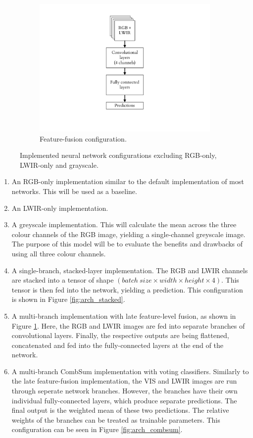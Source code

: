 \documentclass{l4proj}
\begin{document}
\begin{figure}[ht]
\begin{subfigure}[h!]{0.3\textwidth}
    \includegraphics[width=\textwidth, page={3}, trim={6.5cm 2.2cm 6.5cm 1.5cm}, clip]{images/models/archs}
    \caption{Feature-fusion configuration.}
    \label{fig:arch_fusion}
  \end{subfigure}
  \caption{Implemented neural network configurations excluding RGB-only, LWIR-only and grayscale.}
  \label{fig:archs}
\end{figure}

\begin{enumerate}
  \item An RGB-only implementation similar to the default implementation of most networks. This will be used as a baseline.
  \item An LWIR-only implementation.
  \item A greyscale implementation. This will calculate the mean across the three colour channels of the RGB image, yielding a single-channel greyscale image. The purpose of this model will be to evaluate the benefits and drawbacks of using all three colour channels.
  \item A single-branch, stacked-layer implementation. The RGB and LWIR channels are stacked into a tensor of shape $({batch\ size} \times width \times height \times 4)$. This tensor is then fed into the network, yielding a prediction. This configuration is shown in Figure \ref{fig:arch_stacked}.
  \item A multi-branch implementation with late feature-level fusion, as shown in Figure \ref{fig:arch_fusion}. Here, the RGB and LWIR images are fed into separate branches of convolutional layers. Finally, the respective outputs are being flattened, concatenated and fed into the fully-connected layers at the end of the network.
  \item A multi-branch CombSum implementation with voting classifiers. Similarly to the late feature-fusion implementation, the VIS and LWIR images are run through seperate network branches. However, the branches have their own individual fully-connected layers, which produce separate predictions. The final output is the weighted mean of these two predictions. The relative weights of the branches can be treated as trainable parameters. This configuration can be seen in Figure \ref{fig:arch_combsum}.
\end{enumerate}
\end{document}
